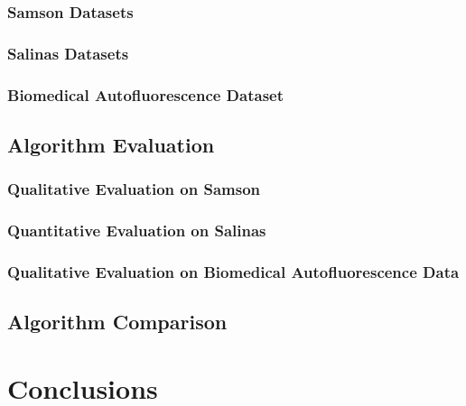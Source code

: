 \documentclass[10pt]{article}
\begin{document}
\subsubsection{Samson Datasets}
\subsubsection{Salinas Datasets}
\subsubsection{Biomedical Autofluorescence Dataset}

\clearpage
\subsection{Algorithm Evaluation}
\subsubsection{Qualitative Evaluation on Samson}
\subsubsection{Quantitative Evaluation on Salinas}
\subsubsection{Qualitative Evaluation on Biomedical Autofluorescence Data}

\clearpage
\subsection{Algorithm Comparison}

\clearpage
% 
% 
% 
% 
% 

\clearpage
% 
% 
% 
% 
% 
\section{Conclusions}
\end{document}
